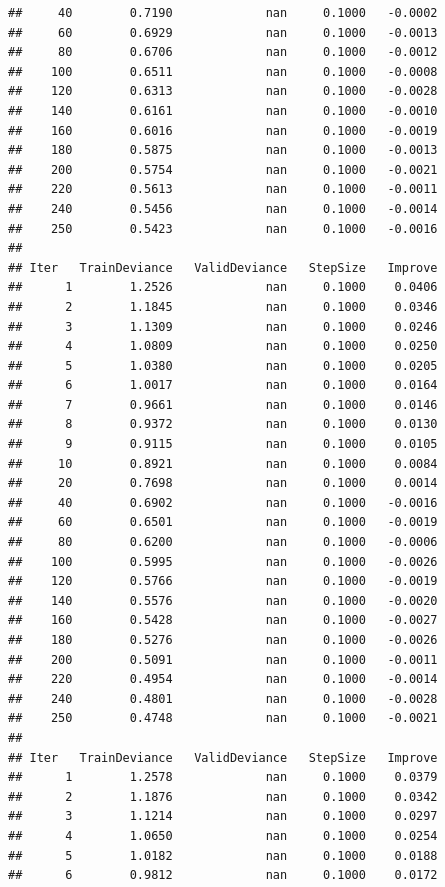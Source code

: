 \documentclass[]{book}
\begin{document}
\begin{verbatim}
##     40        0.7190             nan     0.1000   -0.0002
##     60        0.6929             nan     0.1000   -0.0013
##     80        0.6706             nan     0.1000   -0.0012
##    100        0.6511             nan     0.1000   -0.0008
##    120        0.6313             nan     0.1000   -0.0028
##    140        0.6161             nan     0.1000   -0.0010
##    160        0.6016             nan     0.1000   -0.0019
##    180        0.5875             nan     0.1000   -0.0013
##    200        0.5754             nan     0.1000   -0.0021
##    220        0.5613             nan     0.1000   -0.0011
##    240        0.5456             nan     0.1000   -0.0014
##    250        0.5423             nan     0.1000   -0.0016
## 
## Iter   TrainDeviance   ValidDeviance   StepSize   Improve
##      1        1.2526             nan     0.1000    0.0406
##      2        1.1845             nan     0.1000    0.0346
##      3        1.1309             nan     0.1000    0.0246
##      4        1.0809             nan     0.1000    0.0250
##      5        1.0380             nan     0.1000    0.0205
##      6        1.0017             nan     0.1000    0.0164
##      7        0.9661             nan     0.1000    0.0146
##      8        0.9372             nan     0.1000    0.0130
##      9        0.9115             nan     0.1000    0.0105
##     10        0.8921             nan     0.1000    0.0084
##     20        0.7698             nan     0.1000    0.0014
##     40        0.6902             nan     0.1000   -0.0016
##     60        0.6501             nan     0.1000   -0.0019
##     80        0.6200             nan     0.1000   -0.0006
##    100        0.5995             nan     0.1000   -0.0026
##    120        0.5766             nan     0.1000   -0.0019
##    140        0.5576             nan     0.1000   -0.0020
##    160        0.5428             nan     0.1000   -0.0027
##    180        0.5276             nan     0.1000   -0.0026
##    200        0.5091             nan     0.1000   -0.0011
##    220        0.4954             nan     0.1000   -0.0014
##    240        0.4801             nan     0.1000   -0.0028
##    250        0.4748             nan     0.1000   -0.0021
## 
## Iter   TrainDeviance   ValidDeviance   StepSize   Improve
##      1        1.2578             nan     0.1000    0.0379
##      2        1.1876             nan     0.1000    0.0342
##      3        1.1214             nan     0.1000    0.0297
##      4        1.0650             nan     0.1000    0.0254
##      5        1.0182             nan     0.1000    0.0188
##      6        0.9812             nan     0.1000    0.0172

\end{verbatim}
\end{document}
